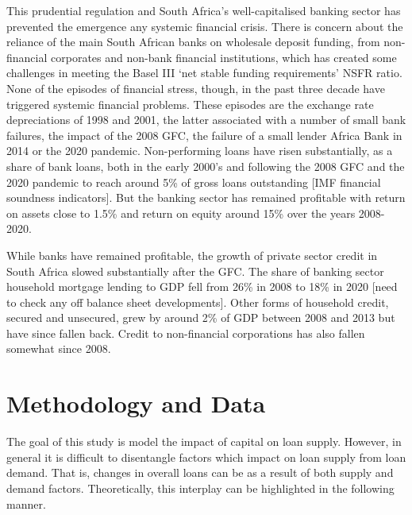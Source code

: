 \documentclass[
]{article}
\begin{document}
This prudential regulation and South Africa's well-capitalised banking sector has prevented the emergence any systemic financial crisis. There is concern about the reliance of the main South African banks on wholesale deposit funding, from non-financial corporates and non-bank financial institutions, which has created some challenges in meeting the Basel III `net stable funding requirements' NSFR ratio. None of the episodes of financial stress, though, in the past three decade have triggered systemic financial problems. These episodes are the exchange rate depreciations of 1998 and 2001, the latter associated with a number of small bank failures, the impact of the 2008 GFC, the failure of a small lender Africa Bank in 2014 or the 2020 pandemic. Non-performing loans have risen substantially, as a share of bank loans, both in the early 2000's and following the 2008 GFC and the 2020 pandemic to reach around 5\% of gross loans outstanding {[}IMF financial soundness indicators{]}. But the banking sector has remained profitable with return on assets close to 1.5\% and return on equity around 15\% over the years 2008-2020.

While banks have remained profitable, the growth of private sector credit in South Africa slowed substantially after the GFC. The share of banking sector household mortgage lending to GDP fell from 26\% in 2008 to 18\% in 2020 {[}need to check any off balance sheet developments{]}. Other forms of household credit, secured and unsecured, grew by around 2\% of GDP between 2008 and 2013 but have since fallen back. Credit to non-financial corporations has also fallen somewhat since 2008.

\hypertarget{methodology-and-data}{%
\section{Methodology and Data}\label{methodology-and-data}}

The goal of this study is model the impact of capital on loan supply. However, in general it is difficult to disentangle factors which impact on loan supply from loan demand. That is, changes in overall loans can be as a result of both supply and demand factors. Theoretically, this interplay can be highlighted in the following manner.

\providecommand{\docline}[3]{\noalign{\global\setlength{\arrayrulewidth}{#1}}\arrayrulecolor[HTML]{#2}\cline{#3}}

\setlength{\tabcolsep}{0pt}
\end{document}
